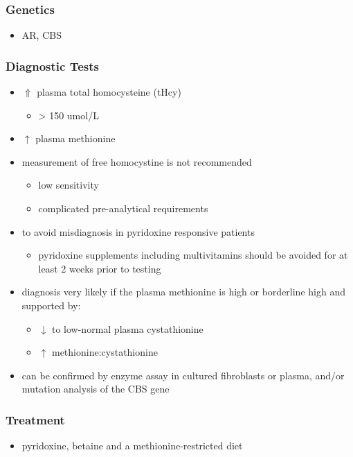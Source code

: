 \documentclass{scrartcl}
\begin{document}
\subsubsection{Genetics}
\label{sec:org0181e79}
\begin{itemize}
\item AR, CBS
\end{itemize}

\subsubsection{Diagnostic Tests}
\label{sec:org9b4b563}
\begin{itemize}
\item \(\Uparrow\) plasma total homocysteine (tHcy)
\begin{itemize}
\item \textgreater{} 150 umol/L
\end{itemize}
\item \(\uparrow\) plasma methionine
\item measurement of free homocystine is not recommended
\begin{itemize}
\item low sensitivity
\item complicated pre-analytical requirements
\end{itemize}
\item to avoid misdiagnosis in pyridoxine responsive patients
\begin{itemize}
\item pyridoxine supplements including multivitamins should be avoided
for at least 2 weeks prior to testing
\end{itemize}
\item diagnosis very likely if the plasma methionine is high or borderline
high and supported by:
\begin{itemize}
\item \(\downarrow\) to low-normal plasma cystathionine
\item \(\uparrow\) methionine:cystathionine
\end{itemize}
\item can be confirmed by enzyme assay in cultured fibroblasts or plasma,
and/or mutation analysis of the CBS gene
\end{itemize}

\subsubsection{Treatment}
\label{sec:org007ec80}
\begin{itemize}
\item pyridoxine, betaine and a methionine-restricted diet
\end{itemize}
\end{document}
